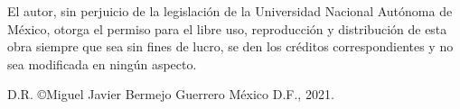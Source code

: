 



El autor, sin perjuicio de la legislación de la Universidad Nacional
Autónoma de México, otorga el permiso para el libre uso,
reproducción y distribución de esta obra siempre que sea sin fines
de lucro, se den los créditos correspondientes y no sea modificada
en ningún aspecto.%

D.R. \copyright Miguel Javier Bermejo Guerrero \hspace{1cm} México
D.F., 2021.%


